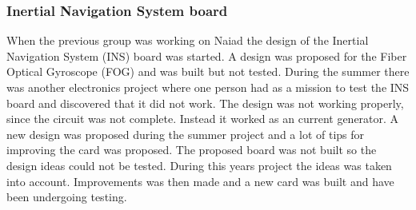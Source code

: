 	\subsubsection{Inertial Navigation System board} %
When the previous group was working on Naiad the design of the Inertial Navigation System (INS) board was started. A design was proposed for the Fiber Optical Gyroscope (FOG) and was built but not tested. During the summer there was another electronics project where one person had as a mission to test the INS board and discovered that it did not work. The design was not working properly, since the circuit was not complete. Instead it worked as an current generator. A new design was proposed during the summer project and a lot of tips for improving the card was proposed. The proposed board was not built so the design ideas could not be tested. During this years project the ideas was taken into account. Improvements was then made and a new card was built and have been undergoing testing.
	